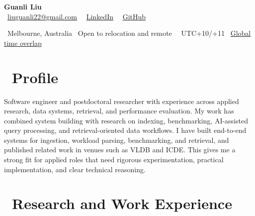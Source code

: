 \documentclass{resume}
\begin{document}

{\LARGE \textbf{Guanli Liu}}\\[-0.2em]
\faEnvelope\ \href{mailto:liuguanli22@gmail.com}{liuguanli22@gmail.com} 
\textperiodcentered\ 
\faLinkedin\ \href{https://www.linkedin.com/in/guanli-liu-11353058/}{LinkedIn} \textperiodcentered\ 
\faGithub\ \href{https://github.com/Liuguanli}{GitHub}

\faMapMarker\ Melbourne, Australia \textperiodcentered\ Open to relocation and remote \textperiodcentered\ 
\faClockO\  UTC+10/+11 \textperiodcentered\ 
\href{https://www.worldtimebuddy.com/?lid=5808079,5128581,5809844,1816670,2158177&h=2158177&hf=1}{Global time overlap \faExternalLink}
\vspace{0.4em}



\section{\faUser\ \textbf{Profile}}
Software engineer and postdoctoral researcher with experience across applied research, data systems, retrieval, and performance evaluation. My work has combined system building with research on indexing, benchmarking, AI-assisted query processing, and retrieval-oriented data workflows. I have built end-to-end systems for ingestion, workload parsing, benchmarking, and retrieval, and published related work in venues such as VLDB and ICDE. This gives me a strong fit for applied roles that need rigorous experimentation, practical implementation, and clear technical reasoning.



\section{\faUsers\ \textbf{Research and Work Experience}}

\end{document}
